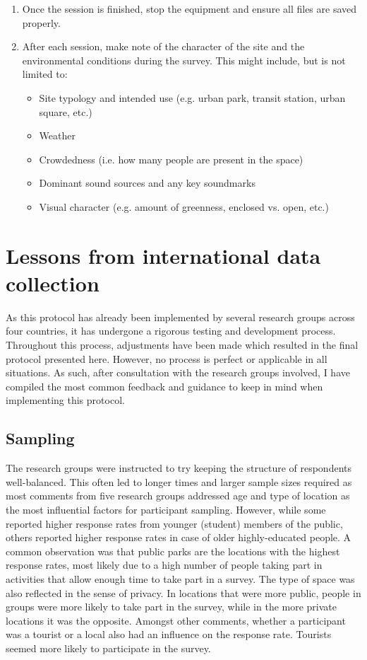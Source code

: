 \begin{enumerate}
     \item Once the session is finished, stop the equipment and ensure all files are saved properly.
     \item After each session, make note of the character of the site and the environmental conditions during the survey. This might include, but is not limited to:
           \begin{itemize}
             \item Site typology and intended use (e.g. urban park, transit station, urban square, etc.)
             \item Weather
             \item Crowdedness (i.e. how many people are present in the space)
             \item Dominant sound sources and any key soundmarks
             \item Visual character (e.g. amount of greenness, enclosed vs. open, etc.)
           \end{itemize}
   \end{enumerate}

\section{Lessons from international data collection}

 As this protocol has already been implemented by several research groups across four countries, it has undergone a rigorous testing and development process. Throughout this process, adjustments have been made which resulted in the final protocol presented here. However, no process is perfect or applicable in all situations. As such, after consultation with the research groups involved, I have compiled the most common feedback and guidance to keep in mind when implementing this protocol.

 \subsection{Sampling}

   The research groups were instructed to try keeping the structure of respondents well-balanced. This often led to longer times and larger sample sizes required as most comments from five research groups addressed age and type of location as the most influential factors for participant sampling. However, while some reported higher response rates from younger (student) members of the public, others reported higher response rates in case of older highly-educated people. A common observation was that public parks are the locations with the highest response rates, most likely due to a high number of people taking part in activities that allow enough time to take part in a survey. The type of space was also reflected in the sense of privacy. In locations that were more public, people in groups were more likely to take part in the survey, while in the more private locations it was the opposite. Amongst other comments, whether a participant was a tourist or a local also had an influence on the response rate. Tourists seemed more likely to participate in the survey.

